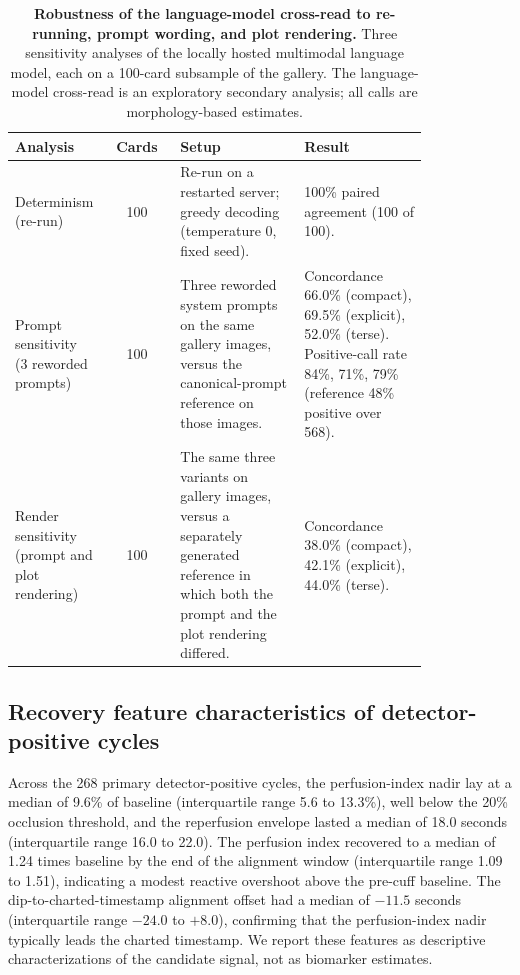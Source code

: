 \documentclass[twocolumn,letterpaper,10pt]{article}
\begin{document}
\begin{table}[tb]
\centering
\caption{\textbf{Robustness of the language-model cross-read to re-running, prompt wording, and plot rendering.} Three sensitivity analyses of the locally hosted multimodal language model, each on a 100-card subsample of the gallery. The language-model cross-read is an exploratory secondary analysis; all calls are morphology-based estimates.}
\label{tab:sensitivity}
\small
\begin{tabular}{@{}p{0.22\linewidth}cp{0.30\linewidth}p{0.30\linewidth}@{}}
\toprule
Analysis & Cards & Setup & Result \\
\midrule
Determinism (re-run) & 100 & Re-run on a restarted server; greedy decoding (temperature 0, fixed seed). & 100\% paired agreement (100 of 100). \\
\addlinespace
Prompt sensitivity (3 reworded prompts) & 100 & Three reworded system prompts on the same gallery images, versus the canonical-prompt reference on those images. & Concordance 66.0\% (compact), 69.5\% (explicit), 52.0\% (terse). Positive-call rate 84\%, 71\%, 79\% (reference 48\% positive over 568). \\
\addlinespace
Render sensitivity (prompt and plot rendering) & 100 & The same three variants on gallery images, versus a separately generated reference in which both the prompt and the plot rendering differed. & Concordance 38.0\% (compact), 42.1\% (explicit), 44.0\% (terse). \\
\bottomrule
\end{tabular}
\end{table}

\subsection{Recovery feature characteristics of detector-positive cycles}

Across the 268 primary detector-positive cycles, the perfusion-index nadir lay at a median of 9.6\% of baseline (interquartile range 5.6 to 13.3\%), well below the 20\% occlusion threshold, and the reperfusion envelope lasted a median of 18.0 seconds (interquartile range 16.0 to 22.0). The perfusion index recovered to a median of 1.24 times baseline by the end of the alignment window (interquartile range 1.09 to 1.51), indicating a modest reactive overshoot above the pre-cuff baseline. The dip-to-charted-timestamp alignment offset had a median of $-11.5$ seconds (interquartile range $-24.0$ to $+8.0$), confirming that the perfusion-index nadir typically leads the charted timestamp. We report these features as descriptive characterizations of the candidate signal, not as biomarker estimates.
\end{document}
